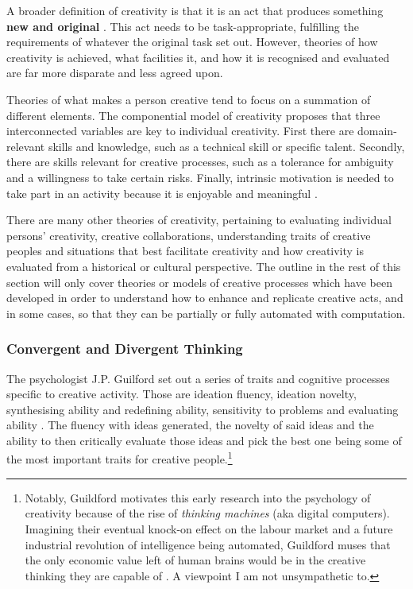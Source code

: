 A broader definition of creativity is that it is an act that produces something \textbf{new and original} \citep{kaufman2021overview}. This act needs to be task-appropriate, fulfilling the requirements of whatever the original task set out. 
However, theories of how creativity is achieved, what facilities it, and how it is recognised and evaluated are far more disparate and less agreed upon. 

Theories of what makes a person creative tend to focus on a summation of different elements.
The componential model of creativity proposes that three interconnected variables are key to individual creativity.
First there are domain-relevant skills and knowledge, such as a technical skill or specific talent.
Secondly, there are skills relevant for creative processes, such as a tolerance for ambiguity and a willingness to take certain risks.
Finally, intrinsic motivation is needed to take part in an activity because it is enjoyable and meaningful \citep{amabile1983social}.

There are many other theories of creativity, pertaining to evaluating individual persons' creativity, creative collaborations, understanding traits of creative peoples and situations that best facilitate creativity and how creativity is evaluated from a historical or cultural perspective. 
The outline in the rest of this section will only cover theories or models of creative processes which have been developed in order to understand how to enhance and replicate creative acts, and in some cases, so that they can be partially or fully automated with computation.

\subsubsection{Convergent and Divergent Thinking}

The psychologist J.P. Guilford set out a series of traits and cognitive processes specific to creative activity. Those are ideation fluency, ideation novelty, synthesising ability and redefining ability, sensitivity to problems and evaluating ability \citep{guilford1950creativity}. 
The fluency with ideas generated, the novelty of said ideas and the ability to then critically evaluate those ideas and pick the best one being some of the most important traits for creative people.\footnote{Notably, Guildford motivates this early research into the psychology of creativity because of the rise of \textit{thinking machines} (aka digital computers). Imagining their eventual knock-on effect on the labour market and a future industrial revolution of intelligence being automated, Guildford muses that the only economic value left of human brains would be in the creative thinking they are capable of \citep{guilford1950creativity}. A viewpoint I am not unsympathetic to.}

